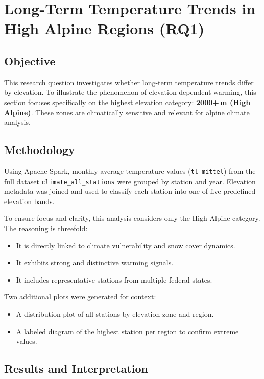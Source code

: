 \section{Long-Term Temperature Trends in High Alpine Regions (RQ1)}

\subsection*{Objective}
This research question investigates whether long-term temperature trends differ by elevation. To illustrate the phenomenon of elevation-dependent warming, this section focuses specifically on the highest elevation category: \textbf{2000+\,m (High Alpine)}. These zones are climatically sensitive and relevant for alpine climate analysis.

\subsection*{Methodology}
Using Apache Spark, monthly average temperature values (\texttt{tl\_mittel}) from the full dataset \texttt{climate\_all\_stations} were grouped by station and year. Elevation metadata was joined and used to classify each station into one of five predefined elevation bands.

To ensure focus and clarity, this analysis considers only the High Alpine category. The reasoning is threefold:
\begin{itemize}
    \item It is directly linked to climate vulnerability and snow cover dynamics.
    \item It exhibits strong and distinctive warming signals.
    \item It includes representative stations from multiple federal states.
\end{itemize}

Two additional plots were generated for context:
\begin{itemize}
    \item A distribution plot of all stations by elevation zone and region.
    \item A labeled diagram of the highest station per region to confirm extreme values.
\end{itemize}

\subsection*{Results and Interpretation}

